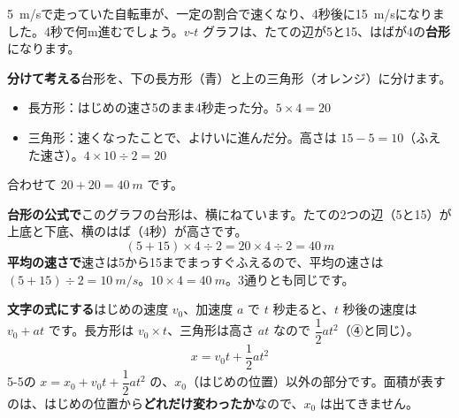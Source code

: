 \label{bk:5-9:daikei}\qty{5}{m/s}で走っていた自転車が、一定の割合で速くなり、4秒後に\qty{15}{m/s}になりました。4秒で何m進むでしょう。$v$-$t$ グラフは、たての辺が5と15、はばが4の\textbf{台形}になります。

\noindent\begin{minipage}[c]{0.46\linewidth}\centering
{}
\end{minipage}\hfill
\begin{minipage}[c]{0.5\linewidth}\raggedright
\textbf{分けて考える}\quad 台形を、下の長方形（青）と上の三角形（オレンジ）に分けます。
\begin{itemize}[leftmargin=1.2\zw, itemsep=1pt, topsep=2pt, label={\color{bkTheme}●}]
\item 長方形：はじめの速さ5のまま4秒走った分。$5\times4=20$
\item 三角形：速くなったことで、よけいに進んだ分。高さは $15-5=10$（ふえた速さ）。$4\times10\div2=20$
\end{itemize}
合わせて $20+20=\qty{40}{m}$ です。
\end{minipage}

\medskip
\noindent\textbf{台形の公式で}\quad このグラフの台形は、横にねています。たての2つの辺（5と15）が上底と下底、横のはば（4秒）が高さです。
\[ (5+15)\times4\div2=20\times4\div2=\qty{40}{m} \]
\textbf{平均の速さで}\quad 速さは5から15までまっすぐふえるので、平均の速さは $(5+15)\div2=\qty{10}{m/s}$。$10\times4=\qty{40}{m}$。3通りとも同じです。

\noindent\textbf{文字の式にする}\quad はじめの速度 $v_0$、加速度 $a$ で $t$ 秒走ると、$t$ 秒後の速度は $v_0+at$ です。長方形は $v_0\times t$、三角形は高さ $at$ なので $\dfrac{1}{2}at^2$（④と同じ）。
\[ x=v_0t+\frac{1}{2}at^2 \]
5-5の $x=x_0+v_0t+\dfrac{1}{2}at^2$ の、$x_0$（はじめの位置）以外の部分です。面積が表すのは、はじめの位置から\textbf{どれだけ変わったか}なので、$x_0$ は出てきません。

